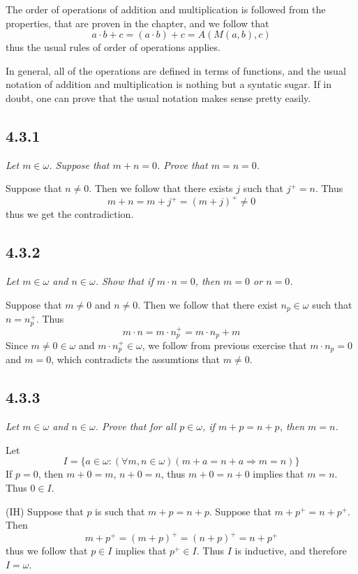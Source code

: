 \documentclass[11pt,oneside,titlepage]{book}
\DeclareMathOperator \ra {\Rightarrow}
\begin{document}
The order of operations of addition and multiplication is followed from the properties,
that are proven in the chapter, and we follow that
$$a \cdot b + c = (a \cdot b) + c = A(M(a, b), c)$$
thus the usual rules of order of operations applies.

In general, all of the operations are defined in terms of functions, and the usual notation
of addition and multiplication is nothing but a syntatic sugar. If in doubt, one can
prove that the usual notation makes sense pretty easily.

\subsection*{4.3.1}

\textit{Let $m \in \omega$. Suppose that $m + n = 0$. Prove that $m = n = 0$.}

Suppose that $n \neq 0$. Then we follow that there exists $j$ such that $j^+ = n$. Thus
$$m + n = m + j^+ = (m + j)^+ \neq 0$$
thus we get the contradiction.

\subsection*{4.3.2}

\textit{Let $m \in \omega$ and $n \in \omega$. Show that if $m \cdot n = 0$, then $m = 0$ or
  $n = 0$.}

Suppose that $m \neq 0$ and $n \neq 0$. Then we follow that there exist $n_p \in \omega$
such that $n = n_p^+$. Thus
$$m \cdot n = m \cdot n_p^+ = m \cdot n_p +  m$$
Since $m \neq 0 \in \omega$ and $m \cdot n_p^+ \in \omega$, we follow from previous exercise
that $m \cdot n_p = 0$ and $m = 0$, which contradicts the assumtions that $m \neq 0$.

\subsection*{4.3.3}

\textit{Let $m \in \omega$ and $n \in \omega$. Prove that for all $p \in \omega$, if
  $m + p = n + p$, then $m = n$.}

Let
$$I = \{a \in \omega: (\forall m, n \in \omega)(m + a = n + a \ra m = n)\}$$
If $p = 0$, then $m + 0 = m$, $n + 0 = n$, thus $m + 0 = n + 0$ implies that $m = n$.
Thus $0 \in I$.

(IH) Suppose that $p$ is such that $m + p = n + p$. Suppose that $m + p^+ = n + p^+$. Then
$$m + p^+ = (m + p)^+ = (n + p)^+ = n + p^+$$
thus we follow that $p \in I$ implies that  $p^+ \in I$. Thus $I$ is inductive, and therefore
$I = \omega$.
\end{document}
